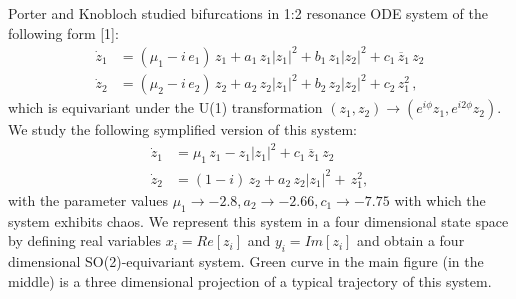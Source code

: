 \color{black}
Porter and Knobloch studied bifurcations in 1:2 resonance ODE system of the following form [1]:
\begin{align*}
  \dot{z}_1 &= (\mu_1- i\, e_1)\,z_1+a_1\,z_1|z_1|^2 +b_1\,z_1|z_2|^2+c_1\,\overline{z}_1\,z_2 \\
  \dot{z}_2 &= (\mu_2- i\, e_2)\,{z_2}+a_2\,z_2|z_1|^2+b_2\,z_2|z_2|^2+c_2\,z_1^2 \,,
\end{align*}
which is equivariant under the U(1) transformation $(z_1, z_2) \rightarrow 
(e^{i \phi} z_1, e^{i 2 \phi} z_2)$. We study the following symplified version 
of this system:
\begin{align*}
  \dot{z}_1 &= \mu_1 \,z_1 - z_1|z_1|^2 +c_1\,\overline{z}_1\,z_2 \\
  \dot{z}_2 &= (1-i)\,{z_2}+a_2\,z_2|z_1|^2+\,z_1^2 ,
\end{align*}
with the parameter values $\mu_1 \rightarrow -2.8, a_2 \rightarrow -2.66, c_1 \rightarrow -7.75$ 
with which the system exhibits chaos. We represent this system in a four dimensional
state space by defining real variables $x_i = Re[z_i]$ and $y_i = Im[z_i]$ and obtain a
four dimensional SO(2)-equivariant system. Green curve in the main figure
(in the middle) is a three dimensional projection of a typical trajectory of this system.
